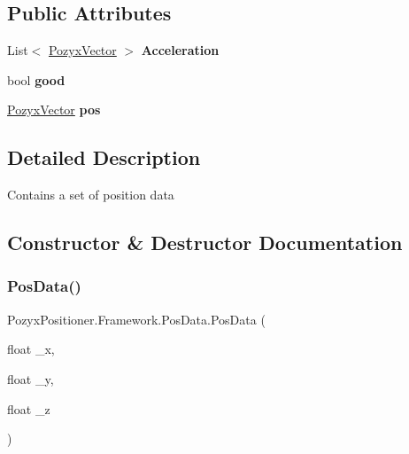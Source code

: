 \subsection*{Public Attributes}
\begin{DoxyCompactItemize}
\item 
\mbox{\label{struct_pozyx_positioner_1_1_framework_1_1_pos_data_a5ad625aaf62369db8ea4cf6943f16686}} 
List$<$ \hyperlink{struct_pozyx_positioner_1_1_framework_1_1_pozyx_vector}{Pozyx\+Vector} $>$ {\bfseries Acceleration}
\item 
\mbox{\label{struct_pozyx_positioner_1_1_framework_1_1_pos_data_a4a3b04e06e199ce825d35917fe9a2edb}} 
bool {\bfseries good}
\item 
\mbox{\label{struct_pozyx_positioner_1_1_framework_1_1_pos_data_a2fde856e364bb1dfcc74e654d7eef2f9}} 
\hyperlink{struct_pozyx_positioner_1_1_framework_1_1_pozyx_vector}{Pozyx\+Vector} {\bfseries pos}
\end{DoxyCompactItemize}


\subsection{Detailed Description}
Contains a set of position data 



\subsection{Constructor \& Destructor Documentation}
\mbox{\label{struct_pozyx_positioner_1_1_framework_1_1_pos_data_a3a87fee055f3468cb530c7b2cb71098f}} 
\subsubsection{\texorpdfstring{Pos\+Data()}{PosData()}}
{\footnotesize\ttfamily Pozyx\+Positioner.\+Framework.\+Pos\+Data.\+Pos\+Data (\begin{DoxyParamCaption}\item[{float}]{\+\_\+x,  }\item[{float}]{\+\_\+y,  }\item[{float}]{\+\_\+z }\end{DoxyParamCaption})}



